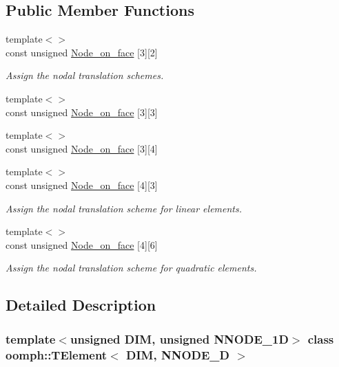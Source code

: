 \subsection*{Public Member Functions}
\begin{DoxyCompactItemize}
\item 
{\footnotesize template$<$$>$ }\\const unsigned \hyperlink{classoomph_1_1TElement_a2067d2c517603bbc041793a7200244f2}{Node\+\_\+on\+\_\+face} \mbox{[}3\mbox{]}\mbox{[}2\mbox{]}
\begin{DoxyCompactList}\small\item\em Assign the nodal translation schemes. \end{DoxyCompactList}\item 
{\footnotesize template$<$$>$ }\\const unsigned \hyperlink{classoomph_1_1TElement_ad5d1478661c226a7cbed31cba42b0ff3}{Node\+\_\+on\+\_\+face} \mbox{[}3\mbox{]}\mbox{[}3\mbox{]}
\item 
{\footnotesize template$<$$>$ }\\const unsigned \hyperlink{classoomph_1_1TElement_a7b52ee28907f88f47df0505a14b32a42}{Node\+\_\+on\+\_\+face} \mbox{[}3\mbox{]}\mbox{[}4\mbox{]}
\item 
{\footnotesize template$<$$>$ }\\const unsigned \hyperlink{classoomph_1_1TElement_a7e803bc4faef1a0e085fe1f556ecf3d2}{Node\+\_\+on\+\_\+face} \mbox{[}4\mbox{]}\mbox{[}3\mbox{]}
\begin{DoxyCompactList}\small\item\em Assign the nodal translation scheme for linear elements. \end{DoxyCompactList}\item 
{\footnotesize template$<$$>$ }\\const unsigned \hyperlink{classoomph_1_1TElement_aed8e8d56fa04ce419d0cc19e5c8c6111}{Node\+\_\+on\+\_\+face} \mbox{[}4\mbox{]}\mbox{[}6\mbox{]}
\begin{DoxyCompactList}\small\item\em Assign the nodal translation scheme for quadratic elements. \end{DoxyCompactList}\end{DoxyCompactItemize}


\subsection{Detailed Description}
\subsubsection*{template$<$unsigned D\+IM, unsigned N\+N\+O\+D\+E\+\_\+1D$>$\newline
class oomph\+::\+T\+Element$<$ D\+I\+M, N\+N\+O\+D\+E\+\_\+D $>$}

